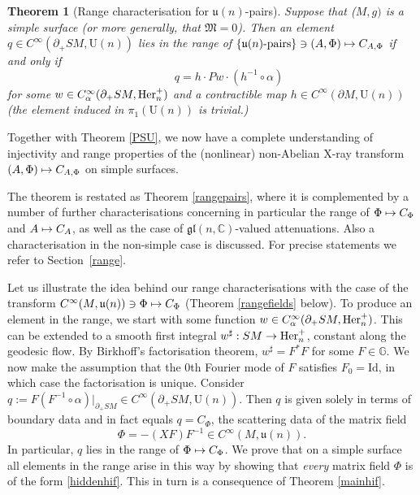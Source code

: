 \documentclass[JEP,XML,SOM,Unicode,published]{cedram}
\newcommand\mto{\mathchoice{\longmapsto}{\mapsto}{\mapsto}{\mapsto}}
\newcommand{\rU}{\mathrm{U}}
\theoremstyle{plain}
\newtheorem{theorem}{Theorem}[section]
\theoremstyle{definition}
\newcommand{\G}{\mathbb{G}}
\newcommand{\C}{\mathbb{C}}
\newcommand{\M}{\mathfrak{M}}
\newcommand{\gl}{\mathfrak{gl}}
\renewcommand{\u}{\mathfrak{u}}
\newcommand{\he}{\textup{Her}}
\newcommand{\Id}{\mathrm{Id}}
\newcommand{\1}{{\bf 1}}
\begin{document}
\begin{theorem}[Range characterisation for $\u(n)$-pairs]\label{mainrange}
Suppose that ($M,g)$ is a simple surface (or more generally, that $\M=0$). Then an element $q\in C^\infty(\partial_+SM,\rU(n))$ lies in the range of $\{\u(n)\text{-pairs}\}\ni (A,\Phi)\mto C_{A,\Phi}$ if and only if
\begin{equation*}
\hspace{3em} q=h \cdot Pw \cdot (h^{-1}\circ \alpha)
\end{equation*}
for some $w\in C_\alpha^\infty(\partial_+SM,\he^+_n)$ and a contractible map $h\in C^\infty(\partial M,\rU(n))$ (\ie the element induced in $\pi_{1}(\rU(n))$ is trivial.)
\end{theorem}

Together with Theorem \ref{PSU}, we now have a complete understanding of injectivity and range properties of the (nonlinear) non-Abelian X-ray transform $(A,\Phi)\mto C_{A,\Phi}$ on simple surfaces.

The theorem is restated as Theorem \ref{rangepairs}, where it is complemented by a number of further characterisations concerning in particular the range of $\Phi \mto C_\Phi$
and $A\mto C_A$, as well as the case of $\gl(n,\C)$-valued attenuations. Also a characterisation in the non-simple case is discussed. For precise statements we refer to Section~\ref{range}.

Let us illustrate the idea behind our range characterisations with the case of the transform $C^\infty(M,\u(n))\ni \Phi\mto C_\Phi$ (\cf Theorem \ref{rangefields} below). To produce an element in the range, we start with some function $w\in C_\alpha^\infty(\partial_+SM,\he^+_n)$. This can be extended to a smooth first integral $w^\sharp:SM\to \he^+_n$, constant along the geodesic flow. By Birkhoff's factorisation theorem, $w^\sharp =F^*F$ for some $F\in \G$. We now make the assumption that the $0$th Fourier mode of $F$ satisfies $F_0=\Id$, in which case the factorisation is unique. Consider $q:=F( F^{-1}\circ \alpha)\vert_{\partial_+SM} \in C^\infty(\partial_+SM,\rU(n))$. Then $q$ is given solely in terms of boundary data and in fact equals $q=C_\Phi$, the scattering data of the matrix field
\begin{equation}\label{hiddenhif} \Phi = -(XF)F^{-1}\in C^\infty(M,\u(n)).
\end{equation} In particular, $q$ lies in the range of $\Phi\mto C_\Phi$. We prove that on a simple surface all elements in the range arise in this way by showing that \emph{every} matrix field $\Phi$ is of the form \eqref{hiddenhif}. This in turn is a consequence of Theorem \ref{mainhif}.
\end{document}
